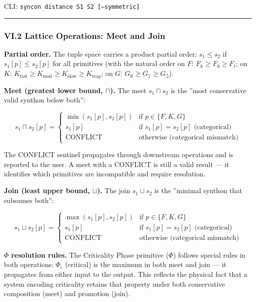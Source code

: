 \documentclass[12pt,a4paper]{article}
\begin{document}
CLI: \texttt{syncon distance S1 S2 {[}--symmetric{]}}

\begin{center}
\rule{0.5\textwidth}{0.4pt}
\end{center}

\subsubsection{VI.2 Lattice Operations: Meet and Join}

\textbf{Partial order.} The tuple space carries a product partial order: $s_1 \leq s_2$ if $s_1[p] \leq s_2[p]$ for all primitives (with the natural order on $F$: $F_{\hbar} \geq F_{\eth} \geq F_{\ell}$; on $K$: $K_{\text{fast}} \geq K_{\text{mod}} \geq K_{\text{slow}} \geq K_{\text{trap}}$; on $G$: $G_{\aleph} \geq G_{\gimel} \geq G_{\beth}$).

\textbf{Meet (greatest lower bound, $\sqcap$).} The meet $s_1 \sqcap s_2$ is the ''most conservative valid synthon below both'':

\[s_1 \sqcap s_2[p] = \begin{cases} \min(s_1[p], s_2[p]) & \text{if } p \in \{F, K, G\} \\ s_1[p] & \text{if } s_1[p] = s_2[p] \text{ (categorical)} \\ \text{CONFLICT} & \text{otherwise (categorical mismatch)} \end{cases}\]

The CONFLICT sentinel propagates through downstream operations and is reported to the user. A meet with a CONFLICT is still a valid result --- it identifies which primitives are incompatible and require resolution.

\textbf{Join (least upper bound, $\sqcup$).} The join $s_1 \sqcup s_2$ is the ''minimal synthon that subsumes both'':

\[s_1 \sqcup s_2[p] = \begin{cases} \max(s_1[p], s_2[p]) & \text{if } p \in \{F, K, G\} \\ s_1[p] & \text{if } s_1[p] = s_2[p] \text{ (categorical)} \\ \text{CONFLICT} & \text{otherwise (categorical mismatch)} \end{cases}\]

\textbf{$\Phi$ resolution rules.} The Criticality Phase primitive ($\Phi$) follows special rules in both operations: $\Phi_c$ (critical) is the maximum in both meet and join --- it propagates from either input to the output. This reflects the physical fact that a system encoding criticality retains that property under both conservative composition (meet) and promotion (join).
\end{document}
